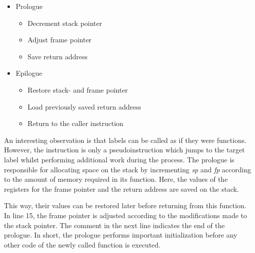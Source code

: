 

\begin{itemize}
	\item Prologue
	      \begin{itemize}
		      \item Decrement stack pointer
		      \item Adjust frame pointer
		      \item Save return address
	      \end{itemize}
	\item Epilogue
	      \begin{itemize}
		      \item Restore stack- and frame pointer
		      \item Load previously saved return address
		      \item Return to the caller instruction
	      \end{itemize}
\end{itemize}

An interesting observation is that labels can be called as if they were functions.
However, the  instruction is only a pseudoinstruction which jumps to the target label whilst performing additional work during the process.
The prologue is responsible for allocating space on the stack by incrementing \emph{sp} and \emph{fp} according to the amount of memory required in its function.
Here, the values of the registers for the frame pointer and the return address are saved on the stack.

This way, their values can be restored later before returning from this function.
In line 15, the frame pointer is adjusted according to the modifications made to the stack pointer.
The comment in the next line indicates the end of the prologue.
In short, the prologue performs important initialization before any other code of the newly called function is executed.

